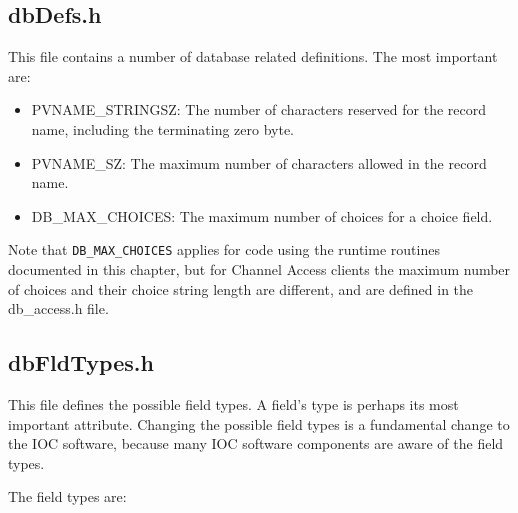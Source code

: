 \subsection{dbDefs.h}

This file contains a number of database related definitions.
The most important are:

\begin{itemize}

\item {}PVNAME\_STRINGSZ: The number of characters reserved for the record name, including the terminating zero byte.

\item {}PVNAME\_SZ: The maximum number of characters allowed in the record name.

\item {}DB\_MAX\_CHOICES: The maximum number of choices for a choice field.

\end{itemize}

Note that \verb|DB_MAX_CHOICES| applies for code using the runtime routines documented in this chapter, but for Channel Access clients the maximum number of choices and their choice string length are different, and are defined in the db\_access.h file.

\subsection{dbFldTypes.h}

This file defines the possible field types.
A field's type is perhaps its most important attribute.
Changing the possible field types is a fundamental change to the IOC software, because many IOC software components are aware of the field types.

The field types are:

